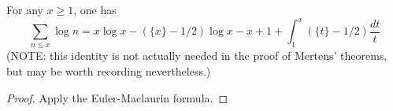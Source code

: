 \begin{lemma}
\label{Mertens-sum-log}
\leanok
For any $x \geq 1$, one has
$$ \sum_{n \leq x} \log n = x \log x - (\{ x \}-1/2) \log x - x + 1 + \int_1^x (\{ t \}-1/2) \frac{dt}{t} $$
(NOTE: this identity is not actually needed in the proof of Mertens' theorems, but may be worth recording nevertheless.)
\end{lemma}
\begin{proof}
\leanok
Apply the Euler-Maclaurin formula.
\end{proof}

